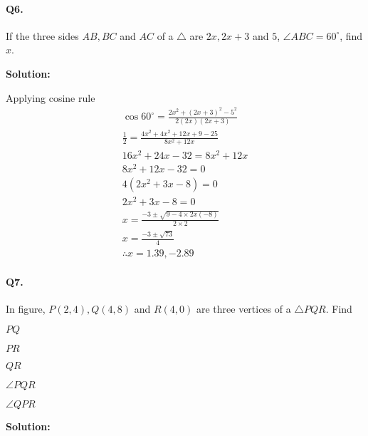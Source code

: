 \documentclass{article}
\begin{document}
\paragraph{Q6.}
If the three sides $AB, BC$ and $AC$ of a $\triangle$ are $2x, 2x+3$ and $5$, $\angle ABC=60^{\circ}$, find $x$.

{\scriptsize \textbf{Solution:}}

Applying cosine rule
\[
  \begin{aligned}
    \cos 60^{\circ} = \frac{2x^{2}+(2x+3)^{2}-5^{2}}{2(2x)(2x+3)} \\
    \frac{1}{2} = \frac{4x^{2}+4x^{2}+12x+9-25}{8x^{2}+12x} \\
    16x^{2}+24x-32 = 8x^{2}+12x \\
    8x^{2}+12x-32 = 0 \\
    4(2x^{2}+3x-8) = 0 \\
    2x^{2}+3x-8 = 0 \\
    x = \frac{-3 \pm \sqrt{9 - 4 \times 2x(-8)}}{2\times2} \\
    x = \frac{-3 \pm \sqrt{73}}{4} \\
    \therefore x = 1.39, -2.89
  \end{aligned}
\]

\paragraph{Q7.}
In figure, $P(2, 4), Q(4, 8)$ and $R(4, 0)$ are three vertices of a $\triangle PQR$. Find
\begin{enumerate*}[label=\roman*)]
  \item $PQ$
  \item $PR$
  \item $QR$
  \item $\angle PQR$
  \item $\angle QPR$
\end{enumerate*}

{\scriptsize \textbf{Solution:}}
\end{document}
